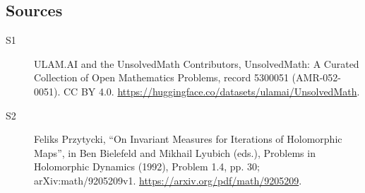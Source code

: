\documentclass[11pt]{article}
\begin{document}
\subsection{Sources}
\begin{description}
\item[\hypertarget{source:5300051:1}{S1}] ULAM.AI and the UnsolvedMath Contributors, UnsolvedMath: A Curated Collection of Open Mathematics Problems, record 5300051 (AMR-052-0051). CC BY 4.0. \url{https://huggingface.co/datasets/ulamai/UnsolvedMath}.
\item[\hypertarget{source:5300051:2}{S2}] Feliks Przytycki, ``On Invariant Measures for Iterations of Holomorphic Maps'', in Ben Bielefeld and Mikhail Lyubich (eds.), Problems in Holomorphic Dynamics (1992), Problem 1.4, pp. 30; arXiv:math/9205209v1. \url{https://arxiv.org/pdf/math/9205209}.
\end{description}
\label{end:5300051}
\end{document}
